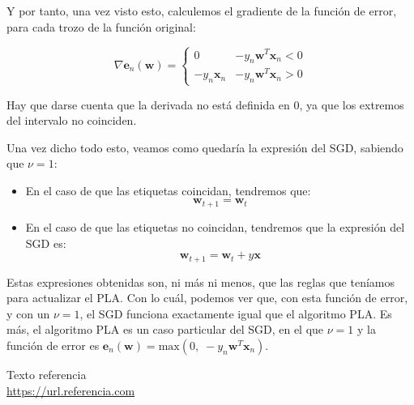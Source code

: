 \documentclass[11pt,a4paper]{article}
\newcommand{\maximum}{\text{max}}
\begin{document}
Y por tanto, una vez visto esto, calculemos el gradiente de la función de error, para cada trozo de la función original:

\begin{equation}
\nabla \mathbf{e}_n(\mathbf{w}) = 
\begin{cases}
	0 & -y_n\mathbf{w}^T\mathbf{x}_n < 0 \\
	-y_n\mathbf{x}_n & -y_n\mathbf{w}^T\mathbf{x}_n > 0
\end{cases}
\end{equation}

Hay que darse cuenta que la derivada no está definida en 0, ya que los extremos del intervalo no coinciden.

Una vez dicho todo esto, veamos como quedaría la expresión del SGD, sabiendo que $\nu = 1$:

\begin{itemize}
	\item En el caso de que las etiquetas coincidan, tendremos que:
	\begin{equation}
		\mathbf{w}_{t+1} = \mathbf{w}_{t}
	\end{equation}
	\item En el caso de que las etiquetas no coincidan, tendremos que la expresión del SGD es:
	\begin{equation}
		\mathbf{w}_{t+1} = \mathbf{w}_{t} + y\mathbf{x}
	\end{equation}
\end{itemize}

Estas expresiones obtenidas son, ni más ni menos, que las reglas que teníamos para actualizar el PLA. Con lo cuál, podemos ver
que, con esta función de error, y con un $\nu = 1$, el SGD funciona exactamente igual que el algoritmo PLA. Es más, el
algoritmo PLA es un caso particular del SGD, en el que $\nu = 1$ y la función de error es
$\mathbf{e}_n(\mathbf{w}) = \maximum(0, \; -y_n\mathbf{w}^T\mathbf{x}_n)$.

\newpage

\begin{thebibliography}{5}

Texto referencia
\\\url{https://url.referencia.com}

\end{thebibliography}
\end{document}
